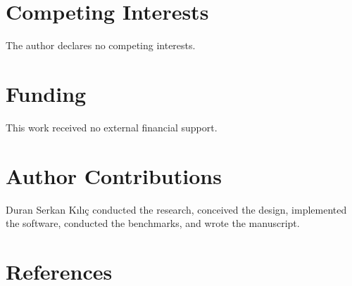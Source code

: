 \documentclass[fleqn,10pt,lineno]{wlpeerj}
\begin{document}
\section{Competing Interests}\label{competing-interests}

The author declares no competing interests.

\section{Funding}\label{funding}

This work received no external financial support.

\section{Author Contributions}\label{author-contributions}

Duran Serkan Kılıç conducted the research, conceived the design,
implemented the software, conducted the benchmarks, and wrote the
manuscript.

\newpage

\section*{References}\label{references}
\end{document}
